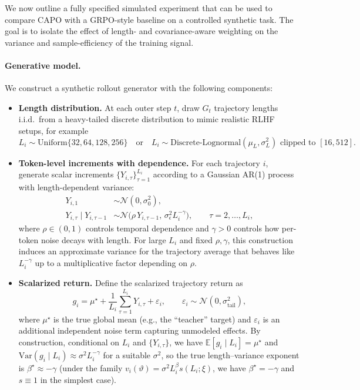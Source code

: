 We now outline a fully specified simulated experiment that can be used to compare CAPO with a GRPO-style baseline on a controlled synthetic task.
The goal is to isolate the effect of length- and covariance-aware weighting on the variance and sample-efficiency of the training signal.

\paragraph{Generative model.}
We construct a synthetic rollout generator with the following components:

\begin{itemize}
  \item \textbf{Length distribution.}
  At each outer step \(t\), draw \(G_t\) trajectory lengths i.i.d.\ from a heavy-tailed discrete distribution to mimic realistic RLHF setups, for example
  \[
  L_i \sim \text{Uniform}\{32,64,128,256\}
  \quad\text{or}\quad
  L_i \sim \text{Discrete-Lognormal}(\mu_L,\sigma_L^2)\text{ clipped to }[16,512].
  \]

  \item \textbf{Token-level increments with dependence.}
  For each trajectory \(i\), generate scalar increments \(\{Y_{i,\tau}\}_{\tau=1}^{L_i}\) according to a Gaussian AR(1) process with length-dependent variance:
  \begin{align*}
    Y_{i,1} &\sim \mathcal N(0,\sigma_0^2),\\
    Y_{i,\tau} \mid Y_{i,\tau-1} &\sim \mathcal N\big(\rho\,Y_{i,\tau-1},\,\sigma_\epsilon^2 L_i^{-\gamma}\big),
    \qquad \tau=2,\dots,L_i,
  \end{align*}
  where \(\rho\in(0,1)\) controls temporal dependence and \(\gamma>0\) controls how per-token noise decays with length.
  For large \(L_i\) and fixed \(\rho,\gamma\), this construction induces an approximate variance for the trajectory average that behaves like \(L_i^{-\gamma}\) up to a multiplicative factor depending on \(\rho\).

  \item \textbf{Scalarized return.}
  Define the scalarized trajectory return as
  \[
  g_i = \mu^\star + \frac{1}{L_i}\sum_{\tau=1}^{L_i} Y_{i,\tau} + \varepsilon_i,
  \qquad
  \varepsilon_i \sim \mathcal N(0,\sigma_{\text{tail}}^2),
  \]
  where $\mu^\star$ is the true global mean (e.g., the “teacher” target) and \(\varepsilon_i\) is an additional independent noise term capturing unmodeled effects.
  By construction, conditional on \(L_i\) and \(\{Y_{i,\tau}\}\), we have \(\mathbb E[g_i\mid L_i]=\mu^\star\) and \(\mathrm{Var}(g_i\mid L_i)\approx \sigma^2 L_i^{-\gamma}\) for a suitable \(\sigma^2\), so the true length–variance exponent is \(\beta^\star\approx -\gamma\) (under the family \(v_i(\vartheta)=\sigma^2 L_i^\beta s(L_i;\xi)\), we have \(\beta^\star=-\gamma\) and \(s\equiv 1\) in the simplest case).
\end{itemize}

